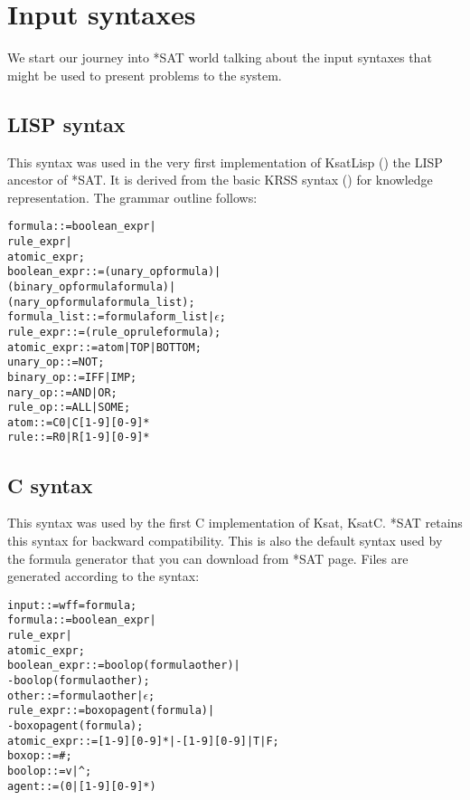 \documentclass[12pt]{report}
\begin{document}
\section{Input syntaxes}
\label{sec:input}

We start our journey into *SAT world talking about the input syntaxes
that might be used to present problems to the system. 

\subsection{LISP syntax}

This syntax was used in the very first implementation of KsatLisp (\cite{giu96b}) the
LISP ancestor of *SAT. It is derived from the basic KRSS syntax
(\cite{pat93a}) for knowledge representation. The grammar outline follows:
\begin{alltt}
\small
formula      ::= boolean_expr |
                 rule_expr    |
                 atomic_expr;
boolean_expr ::= (unary_op formula) |
                 (binary_op formula formula) |
                 (nary_op formula formula_list);
formula_list ::= formula form_list | \(\epsilon\); 
rule_expr    ::= (rule_op rule formula);
atomic_expr  ::= atom | TOP | BOTTOM;
unary_op     ::= NOT;
binary_op    ::= IFF | IMP;
nary_op      ::= AND | OR;
rule_op      ::= ALL | SOME;
atom         ::= C0 | C[1-9][0-9]*
rule         ::= R0 | R[1-9][0-9]*
\end{alltt} 

\subsection{C syntax}

This syntax was used by the first C implementation of Ksat,
KsatC. *SAT retains this syntax for backward compatibility.
This is also the default syntax used by the formula generator that you
can download from *SAT page. Files are generated according to the syntax:

\begin{alltt}
\small
input        ::= wff = formula; 
formula      ::= boolean_expr |
                 rule_expr    |
                 atomic_expr;
boolean_expr ::= boolop ( formula other ) |
                       - boolop ( formula other );
other        ::= formula other | \(\epsilon\); 
rule_expr    ::= boxop agent ( formula ) |
		   - boxop agent ( formula );
atomic_expr  ::= [1-9][0-9]* | -[1-9][0-9] | T | F;
boxop        ::= #;
boolop       ::= v | ^;
agent        ::= (0|[1-9][0-9]*)
\end{alltt}
\end{document}
